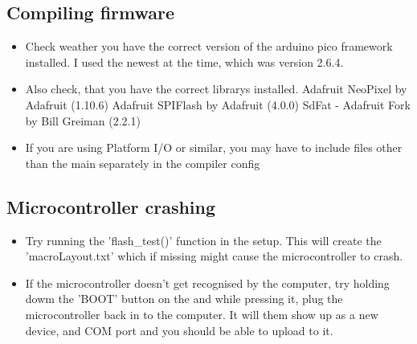 \documentclass[english, 12pt]{scrartcl}
\begin{document}
	\subsection{Compiling firmware}
	\begin{itemize}
		\item Check weather you have the correct version of the arduino pico framework installed. I used the newest at the time, which was version 2.6.4.
		\item Also check, that you have the correct librarys installed.
		\subitem Adafruit NeoPixel by Adafruit (1.10.6)
		\subitem Adafruit SPIFlash by Adafruit (4.0.0)
		\subitem SdFat - Adafruit Fork by Bill Greiman (2.2.1)
		\item If you are using Platform I/O or similar, you may have to include files other than the main separately in the compiler config
	\end{itemize}
	\subsection{Microcontroller crashing}
	\begin{itemize}
		\item Try running the 'flash\_test()' function in the setup. This will create the 'macroLayout.txt' which if missing might cause the microcontroller to crash.
		\item If the microcontroller doesn't get recognised by the computer, try holding dowm the 'BOOT' button on the and while pressing it, plug the microcontroller back in to the computer. It will them show up as a new device, and COM port and you should be able to upload to it.
	\end{itemize}
\end{document}
